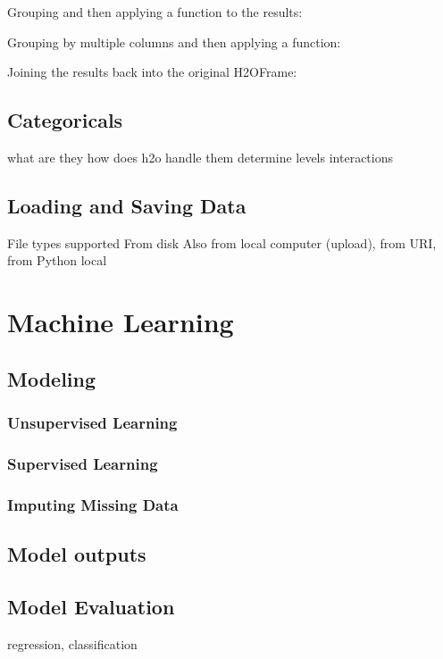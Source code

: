 Grouping and then applying a function to the results:


Grouping by multiple columns and then applying a function:


Joining the results back into the original H2OFrame:


\subsection{Categoricals}
what are they
how does h2o handle them
determine levels
interactions

\subsection{Loading and Saving Data}
File types supported
From disk
Also from local computer (upload), from URI, from Python local


\section{Machine Learning}

\subsection{Modeling}
\subsubsection{Unsupervised Learning}
\subsubsection{Supervised Learning}
\subsubsection{Imputing Missing Data}

\subsection{Model outputs}
\subsection{Model Evaluation}
regression, classification
